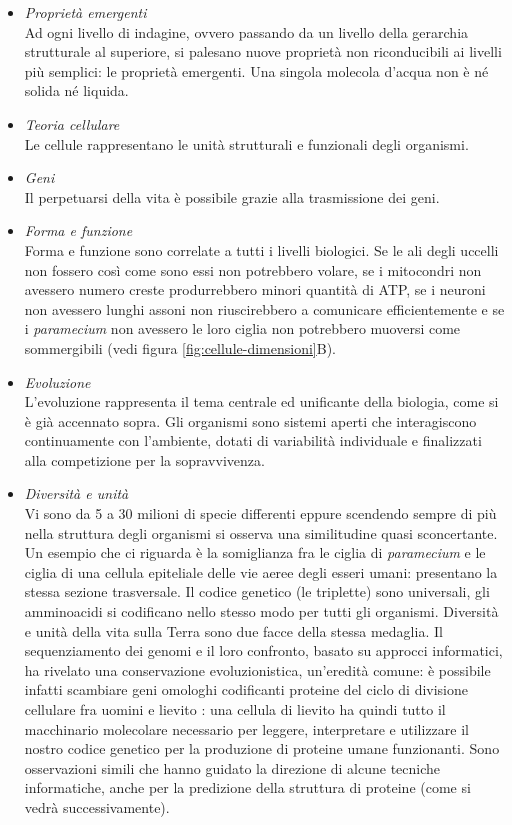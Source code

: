 \begin{itemize}
	\item \textit{Proprietà emergenti }\\
			Ad ogni livello di indagine, ovvero passando da un livello della gerarchia strutturale al superiore, si palesano nuove proprietà non riconducibili ai livelli più semplici: le proprietà emergenti. Una singola molecola d'acqua non è né solida né liquida.
	\item \textit{Teoria cellulare} \\
			Le cellule rappresentano le unità strutturali e funzionali degli organismi.
	\item \textit{Geni} \\
			Il perpetuarsi della vita è possibile grazie alla trasmissione dei geni.
	\item \textit{Forma e funzione} \\
			Forma e funzione sono correlate a tutti i livelli biologici. Se le ali degli uccelli non fossero così come sono essi non potrebbero volare, se i mitocondri non avessero numero creste produrrebbero minori quantità di ATP, se i neuroni non avessero lunghi assoni non riuscirebbero a comunicare efficientemente e se i \textit{paramecium} non avessero le loro ciglia non potrebbero muoversi come sommergibili (vedi figura \ref{fig:cellule-dimensioni}B).
	\item \textit{Evoluzione} \\
			L'evoluzione rappresenta il tema centrale ed unificante della biologia, come si è già accennato sopra. Gli organismi sono sistemi aperti che interagiscono continuamente con l'ambiente, dotati di variabilità individuale e finalizzati alla competizione per la sopravvivenza. 
	\item \textit{Diversità e unità} \\
			Vi sono da 5 a 30 milioni di specie differenti eppure scendendo sempre di più nella struttura degli organismi si osserva una similitudine quasi sconcertante. Un esempio che ci riguarda è la somiglianza fra le ciglia di \textit{paramecium} e le ciglia di una cellula epiteliale delle vie aeree degli esseri umani: presentano la stessa sezione trasversale. Il codice genetico (le triplette) sono universali, gli amminoacidi si codificano nello stesso modo per tutti gli organismi. Diversità e unità della vita sulla Terra sono due facce della stessa medaglia. Il sequenziamento dei genomi e il loro confronto, basato su approcci informatici, ha rivelato una conservazione evoluzionistica, un'eredità comune: è possibile infatti scambiare geni omologhi codificanti proteine del ciclo di divisione cellulare fra uomini e lievito \supercite{alberts2018essential}: una cellula di lievito ha quindi tutto il macchinario molecolare necessario per leggere, interpretare e utilizzare il nostro codice genetico per la produzione di proteine umane funzionanti. Sono osservazioni simili che hanno guidato la direzione di alcune tecniche informatiche, anche per la predizione della struttura di proteine (come si vedrà successivamente).
			
\end{itemize}


